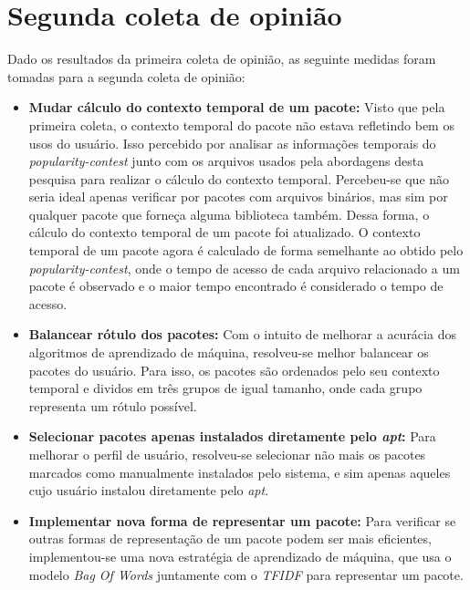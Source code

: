 \section{Segunda coleta de opinião}

Dado os resultados da primeira coleta de opinião, as seguinte medidas foram tomadas
para a segunda coleta de opinião:

\begin{itemize}
   \item \textbf{Mudar cálculo do contexto temporal de um pacote: } Visto que
   pela primeira coleta, o contexto temporal do pacote não estava
   refletindo bem os usos do usuário. Isso percebido por analisar as informações
   temporais do \textit{popularity-contest} junto com os arquivos usados pela
   abordagens desta pesquisa para realizar o cálculo do contexto temporal.
   Percebeu-se que não seria ideal apenas verificar por pacotes com
   arquivos binários, mas sim por qualquer pacote que forneça alguma
   biblioteca também. Dessa forma, o cálculo do contexto temporal de um
   pacote foi atualizado. O contexto temporal de um pacote agora é calculado de
   forma semelhante ao obtido pelo \textit{popularity-contest}, onde o tempo de
   acesso de cada arquivo relacionado a um pacote é observado e o maior tempo
   encontrado é considerado o tempo de acesso.

   \item \textbf{Balancear rótulo dos pacotes: } Com o intuito de melhorar
   a acurácia dos algoritmos de aprendizado de máquina, resolveu-se melhor
   balancear os pacotes do usuário. Para isso, os pacotes são ordenados pelo seu
   contexto temporal e dividos em três grupos de igual tamanho, onde cada grupo
   representa um rótulo possível.

   \item \textbf{Selecionar pacotes apenas instalados diretamente pelo
   \textit{apt}:} Para melhorar o perfil de usuário, resolveu-se selecionar não
   mais os pacotes marcados como manualmente instalados pelo sistema, e sim
   apenas aqueles cujo usuário instalou diretamente pelo \textit{apt}.

   \item \textbf{Implementar nova forma de representar um pacote: } Para
   verificar se outras formas de representação de um pacote podem ser mais
   eficientes, implementou-se uma nova estratégia de aprendizado de máquina, que
   usa o modelo \textit{Bag Of Words} juntamente com o \textit{TFIDF} para
   representar um pacote.


\end{itemize}
